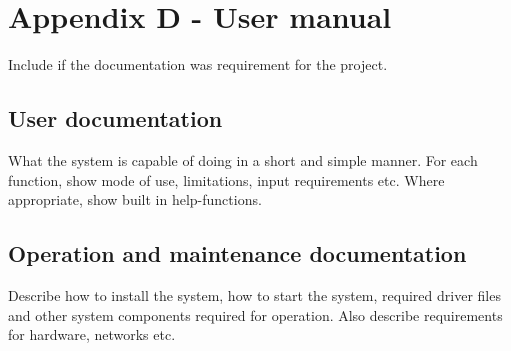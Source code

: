 \section{Appendix D - User manual}
Include if the documentation was requirement for the project.

\subsection{User documentation}
What the system is capable of doing in a short and simple manner. For each function, show mode of use, limitations, input requirements etc. Where appropriate, show built in help-functions.

\subsection{Operation and maintenance documentation}
Describe how to install the system, how to start the system, required driver files and other system components required for operation. Also describe requirements for hardware, networks etc.

\pagebreak
